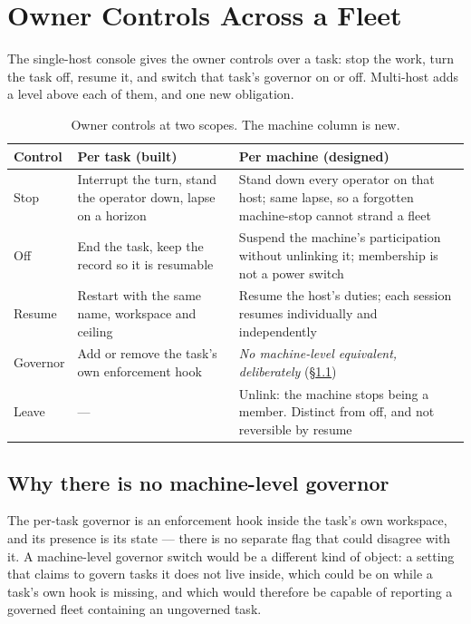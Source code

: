 \documentclass[11pt]{article}
\begin{document}
\section{Owner Controls Across a Fleet}
\label{sec:controls}

The single-host console gives the owner controls over a task: stop the work, turn the task off, resume it, and switch that task's governor on or off. Multi-host adds a level above each of them, and one new obligation.

\begin{table}[h]
\centering\small
\caption{Owner controls at two scopes. The machine column is new.}
\label{tab:controls}
\begin{tabular}{@{}L{2.4cm}L{5.0cm}L{5.6cm}@{}}
\toprule
\textbf{Control} & \textbf{Per task (built)} & \textbf{Per machine (designed)} \\
\midrule
Stop & Interrupt the turn, stand the operator down, lapse on a horizon & Stand down every operator on that host; same lapse, so a forgotten machine-stop cannot strand a fleet \\
Off & End the task, keep the record so it is resumable & Suspend the machine's participation without unlinking it; membership is not a power switch \\
Resume & Restart with the same name, workspace and ceiling & Resume the host's duties; each session resumes individually and independently \\
Governor & Add or remove the task's own enforcement hook & \emph{No machine-level equivalent, deliberately} (\S\ref{sec:nogov}) \\
Leave & --- & Unlink: the machine stops being a member. Distinct from off, and not reversible by resume \\
\bottomrule
\end{tabular}
\end{table}

\subsection{Why there is no machine-level governor}
\label{sec:nogov}

The per-task governor is an enforcement hook inside the task's own workspace, and its presence is its state --- there is no separate flag that could disagree with it. A machine-level governor switch would be a different kind of object: a setting that claims to govern tasks it does not live inside, which could be on while a task's own hook is missing, and which would therefore be capable of reporting a governed fleet containing an ungoverned task.
\end{document}
